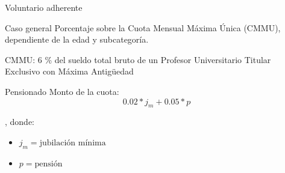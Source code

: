 \documentclass[10pt]{beamer}
\begin{document}
\begin{frame}{Voluntario adherente}
    \begin{block}{Caso general}
        Porcentaje sobre la Cuota Mensual Máxima Única (CMMU), dependiente de la edad y subcategoría.

        CMMU: 6 \% del sueldo total bruto de un Profesor Universitario Titular Exclusivo con Máxima Antigüedad
    \end{block}
    \begin{block}{Pensionado}
        Monto de la cuota:
        \begin{displaymath}
        0.02 * j_m + 0.05 * p
        \end{displaymath}

        , donde:
        \begin{itemize}
            \item $j_m = \text{jubilación mínima}$
            \item $p = \text{pensión}$
        \end{itemize}
    \end{block}
\end{frame}

\end{document}
